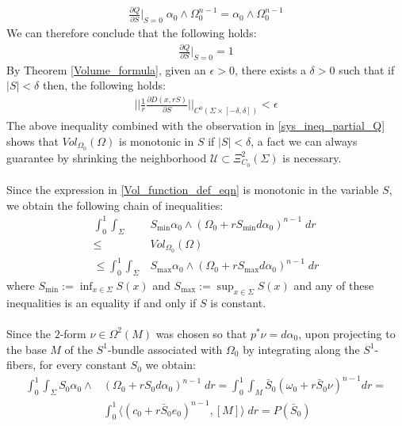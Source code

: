 \documentclass[11pt]{amsart}
\theoremstyle{plain}
\theoremstyle{definition}
\theoremstyle{remark}
\begin{document}
\begin{align}
    \frac{\partial Q}{ \partial S} \big|_{S=0}  \; \alpha_0 \wedge \Omega^{n-1}_0 = \alpha_0 \wedge \Omega_0^{n-1} 
\end{align}
We can therefore conclude that the following holds:
\begin{align}\label{sys_ineq_partial_Q}
    \frac{\partial Q}{ \partial S} \Big|_{S=0} =1
\end{align}
By Theorem \ref{Volume_formula}, given an $\epsilon >0$, there exists a $\delta >0$ such that if $\vert S\vert <\delta$ then, the following holds:
\begin{align*}
    \Bigg\vert \Bigg\vert\frac{1}{r} \frac{\partial D(x,rS)}{\partial S}\Bigg\vert\Bigg\vert_{C^0(\Sigma \times [-\delta,\delta])}  < \epsilon
\end{align*}
The above inequality combined with the observation in \eqref{sys_ineq_partial_Q} shows that $Vol_{\Omega_0}(\Omega)$ is monotonic in $S$ if $\vert S\vert <\delta$, a fact we can always guarantee by shrinking the neighborhood $\mathcal{U} \subset\Xi^2_{C_0}(\Sigma)$ is necessary.\\
\\
Since the expression in \eqref{Vol_function_def_eqn} is monotonic in the variable $S$, we obtain the following chain of inequalities:
\begin{align}\label{sys_ineq_1}
     \int^1_0 \int_{\Sigma}  &S_{\text{min}}\alpha_0 \wedge (\Omega_0 +rS_{\text{min}}d\alpha_0)^{n-1} \; dr \\\nonumber \leq \;\; &Vol_{\Omega_0}(\Omega) \\\nonumber \leq \int^1_0 \int_{\Sigma}  &S_{\text{max}}\alpha_0 \wedge (\Omega_0 +rS_{\text{max}}d\alpha_0)^{n-1} \; dr
\end{align}
where $S_{\text{min}}:= \inf_{x\in \Sigma} S(x)$ and $S_{\text{max}}:= \sup_{x \in \Sigma} S(x)$ and any of these inequalities is an equality if and only if $S$ is constant.\\
\\
Since the $2$-form $\nu \in \Omega^2(M)$ was chosen so that $p^*\nu = d\alpha_0$, upon projecting to the base $M$ of the $S^1$-bundle associated with $\Omega_0$ by integrating along the $S^1$-fibers, for every constant $S_0$ we obtain:
\begin{align}\label{sys_ineq_zoll_poly_vol_relation_leq}
       \int^1_0 \int_{\Sigma}  S_{0}\alpha_0 \wedge &(\Omega_0 +rS_{0}d\alpha_0)^{n-1} \; dr =  \int^1_0 \int_{M}  \bar{S}_{0}(\omega_0 +r\bar{S}_{0} \nu)^{n-1} dr = \\\nonumber &\int^1_0 \langle (c_0+r\bar{S}_{0}e_0)^{n-1} , [M]\rangle \;dr = P(\bar{S}_{0})\end{align}
\end{document}

